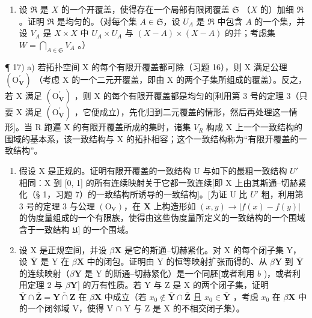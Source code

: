 \begin{enumerate}
\def\labelenumi{\alph{enumi})}
\setcounter{enumi}{1}
\tightlist
\item
  设 \(\Re\) 是 \(X\) 的一个开覆盖，使得存在一个局部有限闭覆盖 \(\mathfrak{S}\) （\(X\) 的）加细 \(\Re\)。证明 \(\Re\) 是均匀的。（对每个集 \(A \in \mathfrak{S}\)，设 \(U_A\) 是 \(\Re\) 中包含 \(A\) 的一个集，并设 \(V_A\) 是 \(X \times X\) 中 \(U_A \times U_A\) 与 \((X - A) \times (X - A)\) 的并；考虑集 \(W = \bigcap_{A \in \mathfrak{S}} V_A\) 。）
\end{enumerate}

¶ 17) a) 若拓扑空间 X 的每个有限开覆盖都可除（习题 16），则 X 满足公理 \((\mathrm{O}_{\mathbf{V}}^{\prime})\) （考虑 X 的一个二元开覆盖，即由 X 的两个子集所组成的覆盖）。反之，若 X 满足 \((\mathrm{O}_{\mathbf{V}}^{\prime})\) ，则 X 的每个有限开覆盖都是均匀的{[}利用第 3 号的定理 3（只要 X 满足 \((\mathrm{O}_{\mathbf{V}}^{\prime})\) ，它便成立），先化归到二元覆盖的情形，然后再处理这一情形{]}。当 R 跑遍 X 的有限开覆盖所成的集时，诸集 \(V_{R}\) 构成 X 上一个一致结构的围域的基本系，该一致结构与 X 的拓扑相容；这个一致结构称为``有限开覆盖的一致结构''。

\begin{enumerate}
\def\labelenumi{\alph{enumi})}
\setcounter{enumi}{1}
\item
  假设 X 是正规的。证明有限开覆盖的一致结构 U 与如下的最粗一致结构 \(U'\) 相同：X 到 {[}0, 1{]} 的所有连续映射关于它都一致连续{[}即 X 上由其斯通–切赫紧化（§ 1，习题 7）的一致结构所诱导的一致结构{]}。{[}为证 U 比 \(U'\) 粗，利用第 3 号的定理 3 与公理 \((\mathrm{O_V})\)，在 \(\mathbf{X}\) 上构造形如 \((x, y) \to |f(x) - f(y)|\) 的伪度量组成的一个有限族，使得由这些伪度量所定义的一致结构的一个围域含于一致结构 \(\mathfrak{U}]\) 的一个围域。
\item
  设 X 是正规空间，并设 \(\beta\mathbf{X}\) 是它的斯通–切赫紧化。对 X 的每个闭子集 Y，设 \(\overline{\mathbf{Y}}\) 是 Y 在 \(\beta\mathbf{X}\) 中的闭包。证明由 Y 的恒等映射扩张而得的、从 \(\beta\mathbf{Y}\) 到 \(\overline{\mathbf{Y}}\) 的连续映射（\(\beta\mathbf{Y}\) 是 Y 的斯通–切赫紧化）是一个同胚{[}或者利用 \(b\) )，或者利用定理 2 与 \(\beta\mathbf{Y}]\) 的万有性质。若 Y 与 Z 是 X 的两个闭子集，证明 \(\overline{\mathbf{Y}} \cap \overline{\mathbf{Z}} = \overline{\mathbf{Y} \cap \mathbf{Z}}\) 在 \(\beta\mathbf{X}\) 中成立（若 \(x_0 \notin \overline{\mathbf{Y}} \cap \overline{\mathbf{Z}}\) 且 \(x_0 \in \overline{\mathbf{Y}}\) ，考虑 \(x_0\) 在 \(\beta\mathbf{X}\) 中的一个闭邻域 V，使得 V \(\cap\) Y 与 Z 是 X 的不相交闭子集）。
\end{enumerate}

